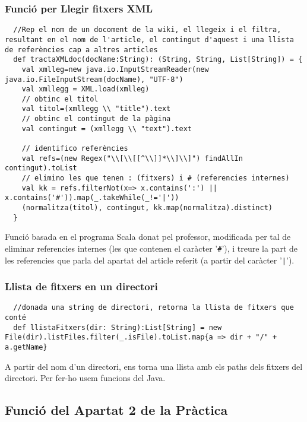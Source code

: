 \documentclass[11pt,a4paper,twoside]{report}
\begin{document}
\subsubsection*{Funció per Llegir fitxers XML}
\begin{lstlisting}
  //Rep el nom de un docoment de la wiki, el llegeix i el filtra, resultant en el nom de l'article, el contingut d'aquest i una llista de referències cap a altres articles
  def tractaXMLdoc(docName:String): (String, String, List[String]) = {
    val xmlleg=new java.io.InputStreamReader(new java.io.FileInputStream(docName), "UTF-8")
    val xmllegg = XML.load(xmlleg)
    // obtinc el titol
    val titol=(xmllegg \\ "title").text
    // obtinc el contingut de la pàgina
    val contingut = (xmllegg \\ "text").text

    // identifico referències
    val refs=(new Regex("\\[\\[[^\\]]*\\]\\]") findAllIn contingut).toList
    // elimino les que tenen : (fitxers) i # (referencies internes)
    val kk = refs.filterNot(x=> x.contains(':') || x.contains('#')).map(_.takeWhile(_!='|'))
    (normalitza(titol), contingut, kk.map(normalitza).distinct)
  }
\end{lstlisting}

Funció basada en el programa Scala donat pel professor, modificada per tal de eliminar referencies internes
(les que contenen el caràcter '\texttt{\#}'), i treure la part de les referencies que parla del apartat del article referit
(a partir del caràcter '\texttt{|}').


\subsubsection*{Llista de fitxers en un directori}
\begin{lstlisting}
  //donada una string de directori, retorna la llista de fitxers que conté
  def llistaFitxers(dir: String):List[String] = new File(dir).listFiles.filter(_.isFile).toList.map{a => dir + "/" + a.getName}
\end{lstlisting}

A partir del nom d'un directori, ens torna una llista amb els paths dels fitxers del directori.
Per fer-ho usem funcions del Java.

\subsection{Funció del Apartat 2 de la Pràctica}
\end{document}
